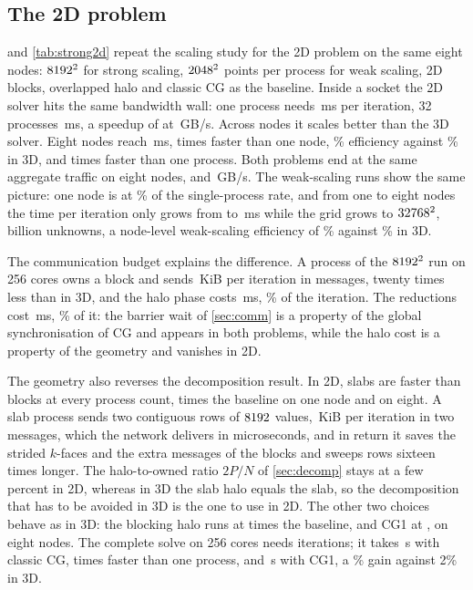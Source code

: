 \documentclass[10pt,a4paper]{article}
\begin{document}
\subsection{The 2D problem}\label{sec:twod}

 and \cref{tab:strong2d} repeat the scaling study for the 2D problem on the same eight
nodes: $8192^2$ for strong scaling, $2048^2$ points per process for weak scaling, 2D blocks,
overlapped halo and classic CG as the baseline. Inside a socket the 2D solver hits the same bandwidth
wall: one process needs \TwoPoneT\,ms per iteration, 32 processes \TwoTnode\,ms, a speedup of
\TwoSpeedNode{} at \TwoBwNode\,GB/s. Across nodes it scales better than the 3D solver. Eight nodes reach
\TwoTmax\,ms, \TwoNodeSpeedMax{} times faster than one node, \TwoNodeEffMax\% efficiency against
\NodeEffPmax\% in 3D, and \TwoSpeedMax{} times faster than one process. Both problems end at the same
aggregate traffic on eight nodes, \TwoBwMax{} and \CGbwAll\,GB/s. The weak-scaling runs show the same
picture: one node is at \TwoWeakEffNode\% of the single-process rate, and from one to eight nodes the
time per iteration only grows from \TwoWeakTnode{} to \TwoWeakTmax\,ms while the grid grows to
$32768^2$, \TwoWeakDofsMax{} billion unknowns, a node-level weak-scaling efficiency of
\TwoWeakNodeEff\% against \WeakNodeEff\% in 3D.

The communication budget explains the difference. A process of the $8192^2$ run on 256 cores owns a
\TwoLocalMax{} block and sends \TwoHaloKiBMax\,KiB per iteration in \TwoMsgsMax{} messages, twenty times
less than in 3D, and the halo phase costs \TwoHaloMsMax\,ms, \TwoHaloFracMax\% of the iteration. The
reductions cost \TwoRedMsMax\,ms, \TwoRedFracMax\% of it: the barrier wait of \cref{sec:comm} is a
property of the global synchronisation of CG and appears in both problems, while the halo cost is a property of the
geometry and vanishes in 2D.

The geometry also reverses the decomposition result. In 2D, slabs are faster than blocks at every process
count, \TwoSlabMin{} times the baseline on one node and \TwoSlabMax{} on eight. A slab process sends two
contiguous rows of $8192$ values, \TwoSlabHaloKiB\,KiB per iteration in two messages, which the network
delivers in microseconds, and in return it saves the strided $k$-faces and the extra messages of the
blocks and sweeps rows sixteen times longer. The halo-to-owned ratio $2P/N$ of \cref{sec:decomp} stays at a
few percent in 2D, whereas in 3D the slab halo equals the slab, so the decomposition that has to be avoided
in 3D is the one to use in 2D. The other two choices behave as in 3D: the blocking halo runs at
\TwoBlockRange{} times the baseline, and CG1 at \TwoCGoneRange, \TwoCGoneMax{} on eight nodes. The
complete solve on 256 cores needs \TwoSolveIters{} iterations; it takes \TwoSolveCG\,s with classic CG,
\TwoSolveSpeedup{} times faster than one process, and \TwoSolveCGone\,s with CG1, a \TwoSolveCGoneGain\%
gain against 2\% in 3D.
\end{document}
